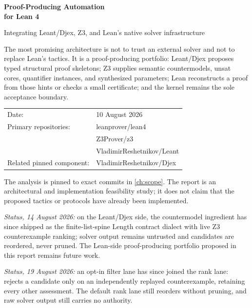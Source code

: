 \documentclass[11pt,letterpaper,openany]{report}
\newcommand{\code}[1]{\texttt{\detokenize{#1}}}
\newcommand{\repo}[1]{\textsf{#1}}
\begin{document}
\hypersetup{pageanchor=false}

\begin{titlepage}
  \thispagestyle{empty}
  \vspace*{10mm}
  {\sffamily\bfseries\fontsize{29}{34}\selectfont\color{Ink}
    Proof-Producing Automation\\[2mm]
    for Lean 4\par}
  \vspace{5mm}
  {\sffamily\fontsize{18}{23}\selectfont\color{Accent}
    Integrating Leant/Djex, Z3, and Lean's native solver infrastructure\par}
  \vspace{13mm}

  \begin{keybox}[title=Central conclusion]
  The most promising architecture is not to trust an external solver and not to
  replace Lean's tactics. It is a proof-producing portfolio: Leant/Djex proposes
  typed structural proof skeletons; Z3 supplies semantic countermodels, unsat
  cores, quantifier instances, and synthesized parameters; Lean reconstructs a
  proof from those hints or checks a small certificate; and the kernel remains the
  sole acceptance boundary.
  \end{keybox}

  \vfill
  \begin{tabular}{@{}ll@{}}
    \textsf{Date:} & 10 August 2026 \\
    \textsf{Primary repositories:} & \repo{leanprover/lean4} \\
                                  & \repo{Z3Prover/z3} \\
                                  & \repo{VladimirReshetnikov/Leant} \\
    \textsf{Related pinned component:} & \repo{VladimirReshetnikov/Djex}
  \end{tabular}
  \vspace{11mm}

  {\small\color{Slate}
  The analysis is pinned to exact commits in \cref{ch:scope}. The report is an
  architectural and implementation feasibility study; it does not claim that the
  proposed tactics or protocols have already been implemented.}

  \vspace{3mm}
  {\small\color{Slate}
  \emph{Status, 14 August 2026:} on the Leant/Djex side, the countermodel
  ingredient has since shipped as the finite-list-spine Length contract
  dialect with live Z3 counterexample ranking; solver output remains
  untrusted and candidates are reordered, never pruned.  The Lean-side
  proof-producing portfolio proposed in this report remains future work.

  \emph{Status, 19 August 2026:} an opt-in filter lane has since joined the
  rank lane: \code{:synth --behavior-mode filter} rejects a candidate only
  on an independently replayed counterexample, retaining every other
  assessment.  The default rank lane still reorders without pruning, and
  raw solver output still carries no authority.}
\end{titlepage}
\end{document}
